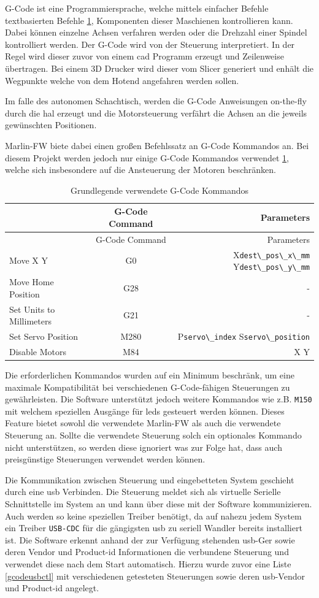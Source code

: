 G-Code ist eine Programmiersprache, welche mittels einfacher Befehle
textbasierten Befehle \ref{gcodecmd}, Komponenten dieser Maschienen
kontrollieren kann. Dabei können einzelne Achsen verfahren werden oder
die Drehzahl einer Spindel kontrolliert werden. Der G-Code wird von der
Steuerung interpretiert. In der Regel wird dieser zuvor von einem
\gls{cad} Programm erzeugt und Zeilenweise übertragen. Bei einem 3D
Drucker wird dieser vom Slicer generiert und enhält die Wegpunkte welche
von dem Hotend angefahren werden sollen.

Im falle des autonomen Schachtisch, werden die G-Code Anweisungen
on-the-fly durch die \gls{hal} erzeugt und die Motorsteuerung verfährt
die Achsen an die jeweils gewünschten Positionen.

Marlin-FW\cite{marlinfw} biete dabei einen großen Befehlssatz an
G-Code Kommandos an. Bei diesem Projekt werden jedoch nur einige G-Code
Kommandos verwendet \ref{gcodecmd}, welche sich insbesondere auf die
Ansteuerung der Motoren beschränken.

\begin{longtable}[]{@{}lcr@{}}
\caption{Grundlegende verwendete G-Code Kommandos
\label{gcodecmd}}\tabularnewline
\toprule
& G-Code Command & Parameters\tabularnewline
\midrule
\endfirsthead
\toprule
& G-Code Command & Parameters\tabularnewline
\midrule
\endhead
Move X Y & G0 & X\passthrough{\lstinline!dest\_pos\_x\_mm!}
Y\passthrough{\lstinline!dest\_pos\_y\_mm!}\tabularnewline
Move Home Position & G28 & -\tabularnewline
Set Units to Millimeters & G21 & -\tabularnewline
Set Servo Position & M280 & P\passthrough{\lstinline!servo\_index!}
S\passthrough{\lstinline!servo\_position!}\tabularnewline
Disable Motors & M84 & X Y\tabularnewline
\bottomrule
\end{longtable}

Die erforderlichen Kommandos wurden auf ein Minimum beschränk, um eine
maximale Kompatibilität bei verschiedenen G-Code-fähigen Steuerungen zu
gewährleisten. Die Software unterstützt jedoch weitere Kommandos wie
z.B. \passthrough{\lstinline!M150!} mit welchem speziellen Ausgänge für
\gls{led}s gesteuert werden können. Dieses Feature bietet sowohl die
verwendete Marlin-FW\cite{marlinfw} als auch die verwendete
Steuerung an. Sollte die verwendete Steuerung solch ein optionales
Kommando nicht unterstützen, so werden diese ignoriert was zur Folge
hat, dass auch preisgünstige Steuerungen verwendet werden können.

Die Kommunikation zwischen Steuerung und eingebetteten System geschieht
durch eine \gls{usb} Verbinden. Die Steuerung meldet sich als virtuelle
Serielle Schnittstelle im System an und kann über diese mit der Software
kommunizieren. Auch werden so keine speziellen Treiber benötigt, da auf
nahezu jedem System ein Treiber \passthrough{\lstinline!USB-CDC!} für
die gängigsten \gls{usb} zu seriell Wandler bereits installiert ist. Die
Software erkennt anhand der zur Verfügung stehenden \gls{usb}-Ger sowie
deren Vendor und Product-\gls{id} Informationen die verbundene Steuerung
und verwendet diese nach dem Start automatisch. Hierzu wurde zuvor eine
Liste \ref{gcodeusbctl} mit verschiedenen getesteten Steuerungen sowie
deren \gls{usb}-Vendor und Product-\gls{id} angelegt.

